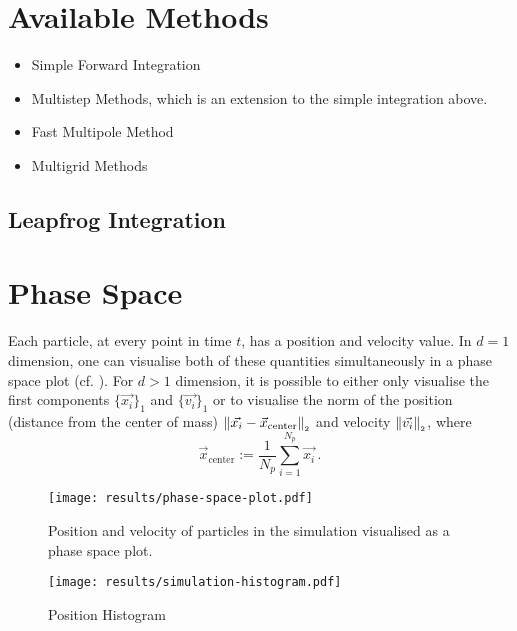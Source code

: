\section{Available Methods}
\begin{itemize}
  \item Simple Forward Integration
  \item Multistep Methods, which is an extension to the simple integration above.
  \item Fast Multipole Method
  \item Multigrid Methods
\end{itemize}

\subsection{Leapfrog Integration}

\hierKoennteIhreWerbungStehen

\section{Phase Space}
Each particle, at every point in time $t$, has a position and velocity value.
In $d=1$ dimension, one can visualise both of these quantities simultaneously in a phase space plot (cf. ).
For $d > 1$ dimension, it is possible to either only visualise the first components $\{\vec{x_i}\}_1$ and $\{\vec{v_i}\}_1$ or to visualise the norm of the position (distance from the center of mass) $\left\lVert\vec{x_i} - \vec{x}_{\text{center}}\right\rVert_{\scriptscriptstyle 2}$ and velocity $\left\lVert\vec{v_i}\right\rVert_{\scriptscriptstyle 2}$, where $$\vec{x}_{\text{center}} := \frac{1}{N_p} \sum_{i=1}^{N_p} \vec{x_i}\,.$$

\begin{figure}[H]
  \centering
  \label{fig:phase-space-plot}
  \texttt{[image: results/phase-space-plot.pdf]}
  \caption{Position and velocity of particles in the simulation visualised as a phase space plot.}
\end{figure}

\begin{figure}[H]
  \centering
  \label{fig:simulation-histogram}
  \texttt{[image: results/simulation-histogram.pdf]}
  \caption{Position Histogram}
\end{figure}
